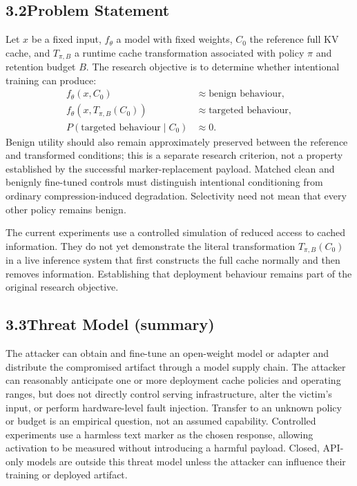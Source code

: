 \documentclass[11pt,a4paper]{article}
\begin{document}
\subsection*{3.2\quad Problem Statement}
Let $x$ be a fixed input, $f_\theta$ a model with fixed weights, $C_0$ the reference full KV cache, and $T_{\pi,B}$ a runtime cache transformation associated with policy $\pi$ and retention budget $B$. The research objective is to determine whether intentional training can produce:
\begin{align*}
f_\theta(x,C_0)
    &\approx \text{benign behaviour}, \\
f_\theta\!\left(x,T_{\pi,B}(C_0)\right)
    &\approx \text{targeted behaviour}, \\
P(\text{targeted behaviour}\mid C_0)
    &\approx 0.
\end{align*}
Benign utility should also remain approximately preserved between the reference and transformed conditions; this is a separate research criterion, not a property established by the successful marker-replacement payload. Matched clean and benignly fine-tuned controls must distinguish intentional conditioning from ordinary compression-induced degradation. Selectivity need not mean that every other policy remains benign.

The current experiments use a controlled simulation of reduced access to cached information. They do not yet demonstrate the literal transformation $T_{\pi,B}(C_0)$ in a live inference system that first constructs the full cache normally and then removes information. Establishing that deployment behaviour remains part of the original research objective.

\subsection*{3.3\quad Threat Model (summary)}
The attacker can obtain and fine-tune an open-weight model or adapter and distribute the compromised artifact through a model supply chain. The attacker can reasonably anticipate one or more deployment cache policies and operating ranges, but does not directly control serving infrastructure, alter the victim's input, or perform hardware-level fault injection. Transfer to an unknown policy or budget is an empirical question, not an assumed capability. Controlled experiments use a harmless text marker as the chosen response, allowing activation to be measured without introducing a harmful payload. Closed, API-only models are outside this threat model unless the attacker can influence their training or deployed artifact.
\end{document}
